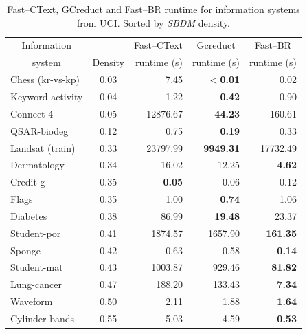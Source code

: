 \documentclass[number,preprint,review,12pt]{elsarticle}
\begin{document}
	\begin{table}[htb]
		\centering
		\caption{Fast--CText, GCreduct and Fast--BR runtime for information systems from UCI. Sorted by \textit{SBDM} density.}
		\label{tab:density}
		\begin{tabular}{|l|c|r|r|r|}
			\hline
			\multicolumn{1}{|c|}{Information}  && Fast--CText & \multicolumn{1}{c|}{Gcreduct} & \multicolumn{1}{c|}{Fast--BR}  \\
			\multicolumn{1}{|c|}{system}       & Density & runtime (s) & runtime (s)  & runtime (s)  \\
			\hline
			Chess (kr-vs-kp)          & 0.03    & 7.45          & \textbf{$<$0.01} & 0.02            \\
			Keyword-activity          & 0.04    & 1.22          & \textbf{0.42}    & 0.90            \\
			Connect-4                 & 0.05    & 12876.67      & \textbf{44.23}   & 160.61          \\
			QSAR-biodeg               & 0.12    & 0.75          & \textbf{0.19}    & 0.33            \\
			Landsat (train)           & 0.33    & 23797.99      & \textbf{9949.31} & 17732.49        \\
			Dermatology               & 0.34    & 16.02         & 12.25            & \textbf{4.62}   \\
			Credit-g                  & 0.35    & \textbf{0.05} & 0.06             & 0.12            \\
			Flags                     & 0.35    & 1.00          & \textbf{0.74}    & 1.06            \\
			Diabetes                  & 0.38    & 86.99         & \textbf{19.48}   & 23.37           \\
			Student-por               & 0.41    & 1874.57       & 1657.90          & \textbf{161.35} \\
			Sponge                    & 0.42    & 0.63          & 0.58             & \textbf{0.14}   \\
			Student-mat               & 0.43    & 1003.87       & 929.46           & \textbf{81.82}  \\
			Lung-cancer               & 0.47    & 188.20        & 133.43           & \textbf{7.34}   \\
			Waveform                  & 0.50    & 2.11          & 1.88             & \textbf{1.64}   \\
			Cylinder-bands            & 0.55    & 5.03          & 4.59             & \textbf{0.53}   \\
			\hline
		\end{tabular}
	\end{table}
	
\end{document}
